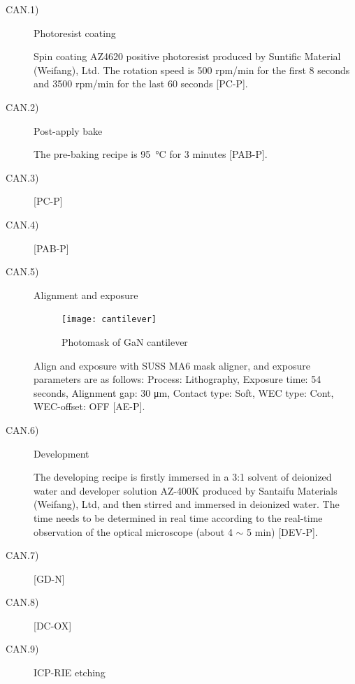 \begin{description}

	\item[CAN.1)] Photoresist coating
	
	Spin coating AZ4620 positive photoresist produced by Suntific Material (Weifang), Ltd. The rotation speed is 500 rpm/min for the first 8 seconds and 3500 rpm/min for the last 60 seconds [PC-P].
	
	\item[CAN.2)] Post-apply bake
	
	The pre-baking  recipe is \SI{95}{\degreeCelsius} for 3 minutes [PAB-P].
	
	\item[CAN.3)] [PC-P]
	

	\item[CAN.4)] [PAB-P]
	
	
	\item[CAN.5)] Alignment and exposure
	
\begin{figure}[H] 
\centering    
\texttt{[image: cantilever]}
\caption[Photomask of GaN cantilever]{Photomask of GaN cantilever}
\label{fig:cantilever}
\end{figure}

	Align  and exposure  with SUSS MA6 mask aligner, and exposure parameters are as follows: Process: Lithography, Exposure time: 54 seconds, Alignment gap: 30 \unit{\um}, Contact type: Soft, WEC type: Cont, WEC-offset: OFF [AE-P].

	\item[CAN.6)] Development
	
	The  developing  recipe is firstly immersed in a 3:1 solvent of deionized  water  and developer solution AZ-400K produced by Santaifu Materials (Weifang), Ltd, and then stirred and immersed in deionized water. The time needs to be determined in real time according to the real-time observation of the optical microscope (about 4 $\sim$ 5 \unit{\minute}) [DEV-P].
	
	\item[CAN.7)] [GD-N]
	
	\item[CAN.8)] [DC-OX]
	
	\item[CAN.9)] ICP-RIE etching


\end{description}
